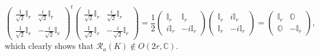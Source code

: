 \documentclass[aps, preprint]{revtex4}
\begin{document}
\begin{equation}\left (\begin{array}{cc}\frac{1}{\sqrt{2}} \mathbb{I}_{r} & \frac{i}{\sqrt{2}} \mathbb{I}_{r} \\
\frac{1}{\sqrt{2}} \mathbb{I}_{r} &  -\frac{i}{\sqrt{2}} \mathbb{I}_{r}\end{array}\right )^{t} \left (\begin{array}{cc}\frac{1}{\sqrt{2}} \mathbb{I}_{r} & \frac{i}{\sqrt{2}} \mathbb{I}_{r} \\
\frac{1}{\sqrt{2}} \mathbb{I}_{r} &  -\frac{i}{\sqrt{2}} \mathbb{I}_{r}\end{array}\right ) =\frac{1}{2} \left (\begin{array}{cc}\mathbb{I}_{r} & \mathbb{I}_{r} \\
i \mathbb{I}_{r} &  -i \mathbb{I}_{r}\end{array}\right ) \left (\begin{array}{cc}\mathbb{I}_{r} & i \mathbb{I}_{r} \\
\mathbb{I}_{r} &  -i \mathbb{I}_{r}\end{array}\right ) =\left (\begin{array}{cc}\mathbb{I}_{r} & \mathbb{O} \\
\mathbb{O} &  -\mathbb{I}_{r}\end{array}\right )\text{,}
\end{equation}which clearly shows that $\mathcal{R}_{a} \left (K\right ) \notin O \left (2 r ,\mathbb{C}\right )\text{.}$ 
\end{document}
